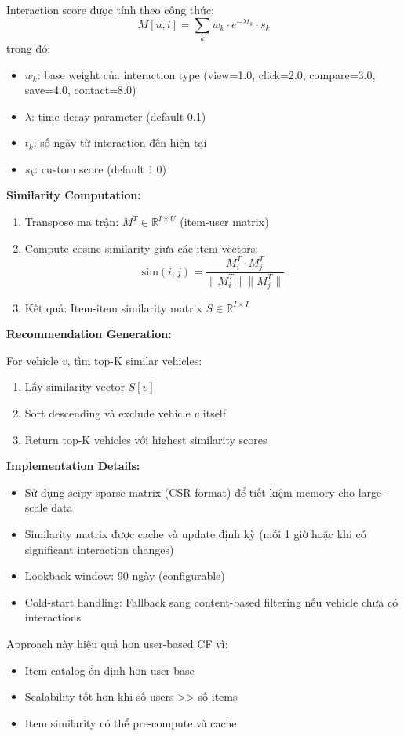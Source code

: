 Interaction score được tính theo công thức:
\[
M[u,i] = \sum_{k} w_k \cdot e^{-\lambda t_k} \cdot s_k
\]
trong đó:
\begin{itemize}
    \item $w_k$: base weight của interaction type (view=1.0, click=2.0, compare=3.0, save=4.0, contact=8.0)
    \item $\lambda$: time decay parameter (default 0.1)
    \item $t_k$: số ngày từ interaction đến hiện tại
    \item $s_k$: custom score (default 1.0)
\end{itemize}

\textbf{Similarity Computation:}

\begin{enumerate}
    \item Transpose ma trận: $M^T \in \mathbb{R}^{I \times U}$ (item-user matrix)
    \item Compute cosine similarity giữa các item vectors:
    \[
    \text{sim}(i, j) = \frac{M^T_i \cdot M^T_j}{\|M^T_i\| \|M^T_j\|}
    \]
    \item Kết quả: Item-item similarity matrix $S \in \mathbb{R}^{I \times I}$
\end{enumerate}

\textbf{Recommendation Generation:}

For vehicle $v$, tìm top-K similar vehicles:
\begin{enumerate}
    \item Lấy similarity vector $S[v]$
    \item Sort descending và exclude vehicle $v$ itself
    \item Return top-K vehicles với highest similarity scores
\end{enumerate}

\textbf{Implementation Details:}
\begin{itemize}
    \item Sử dụng scipy sparse matrix (CSR format) để tiết kiệm memory cho large-scale data
    \item Similarity matrix được cache và update định kỳ (mỗi 1 giờ hoặc khi có significant interaction changes)
    \item Lookback window: 90 ngày (configurable)
    \item Cold-start handling: Fallback sang content-based filtering nếu vehicle chưa có interactions
\end{itemize}

Approach này hiệu quả hơn user-based CF vì:
\begin{itemize}
    \item Item catalog ổn định hơn user base
    \item Scalability tốt hơn khi số users >> số items
    \item Item similarity có thể pre-compute và cache
\end{itemize}

